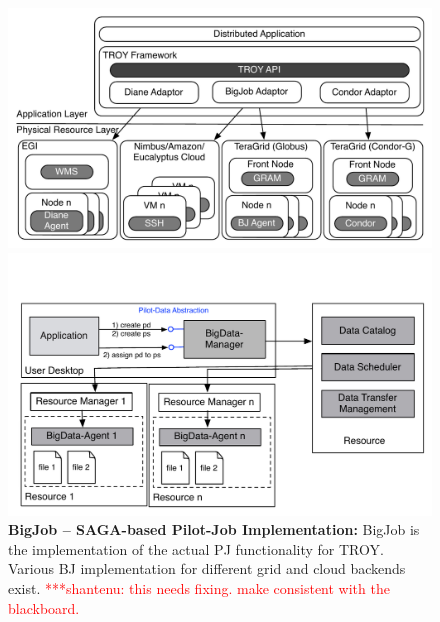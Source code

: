 \documentclass[conference,final]{IEEEtran}
\newcommand{\jhanote}[1]{ {\textcolor{red} { ***shantenu: #1 }}}
\newcommand{\alnote}[1]{ {\textcolor{blue} { ***andre: #1 }}}
\newcommand{\alnote}[1]{}
\newcommand{\jhanote}[1]{}
\newcommand{\up}{\vspace*{-1em}}
\begin{document}



\begin{figure}[t]
  \up\up\up
	\begin{minipage}[t]{0.475\linewidth}
	\centering
	\includegraphics[width=\textwidth]{figures/distributed_pilot_job.pdf}
	\caption{\textbf{BigJob -- SAGA-based Pilot-Job Implementation:}
          BigJob is the implementation of the actual PJ functionality
          for TROY. Various BJ implementation for different grid and
          cloud backends exist. \jhanote{this needs fixing. make
            consistent with the blackboard.}}
	\label{fig:figures_distributed_pilot_job}
	\end{minipage}
	\hspace{0.035\linewidth}
	\begin{minipage}[t]{0.475\linewidth}
	\centering
   	\includegraphics[width=\textwidth]{figures/pilot-data-manager.pdf}

\end{minipage}
\end{figure}
\end{document}
